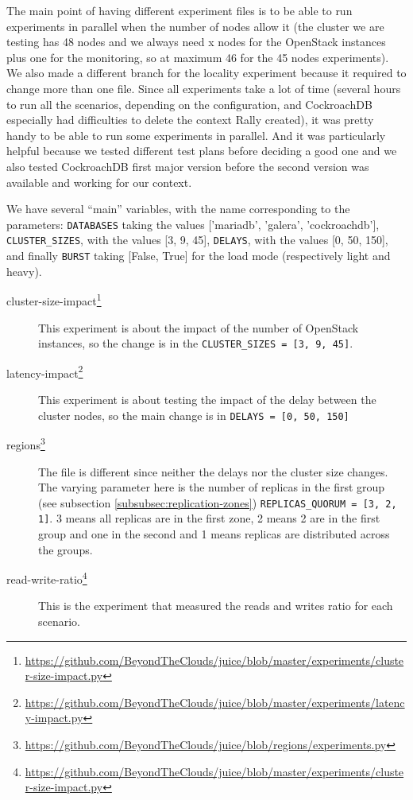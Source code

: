 The main point of having different experiment files is to be able to run experiments in parallel when the number of nodes allow it (the cluster we are testing has 48 nodes and we always need x nodes for the OpenStack instances plus one for the monitoring, so at maximum 46 for the 45 nodes experiments). We also made a different branch for the locality experiment because it required to change more than one file. Since all experiments take a lot of time (several hours to run all the scenarios, depending on the configuration, and CockroachDB especially had difficulties to delete the context Rally created), it was pretty handy to be able to run some experiments in parallel. And it was particularly helpful because we tested different test plans before deciding a good one and we also tested CockroachDB first major version before the second version was available and working for our context.

We have several ``main'' variables, with the name corresponding to the parameters: \verb+DATABASES+ taking the values ['mariadb', 'galera', 'cockroachdb'], \verb+CLUSTER_SIZES+, with the values [3, 9, 45], \verb+DELAYS+, with the values [0, 50, 150], and finally \verb+BURST+ taking [False, True] for the load mode (respectively light and heavy).

\begin{description}
\item[cluster-size-impact\footnote{\url{https://github.com/BeyondTheClouds/juice/blob/master/experiments/cluster-size-impact.py}}] This experiment is about the impact of the number of OpenStack instances, so the change is in the \verb+CLUSTER_SIZES = [3, 9, 45]+.
  \item[latency-impact\footnote{\url{https://github.com/BeyondTheClouds/juice/blob/master/experiments/latency-impact.py}}] This experiment is about testing the impact of the delay between the cluster nodes, so the main change is in \verb+DELAYS = [0, 50, 150]+
\item[regions\footnote{\url{https://github.com/BeyondTheClouds/juice/blob/regions/experiments.py}}] The file is different since neither the delays nor the cluster size changes. The varying parameter here is the number of replicas in the first group (see subsection \ref{subsubsec:replication-zones}) \verb+REPLICAS_QUORUM = [3, 2, 1]+. 3 means all replicas are in the first zone, 2 means 2 are in the first group and one in the second and 1 means replicas are distributed across the groups.
  \item[read-write-ratio\footnote{\url{https://github.com/BeyondTheClouds/juice/blob/master/experiments/cluster-size-impact.py}}] This is the experiment that measured the reads and writes ratio for each scenario.
\end{description}
